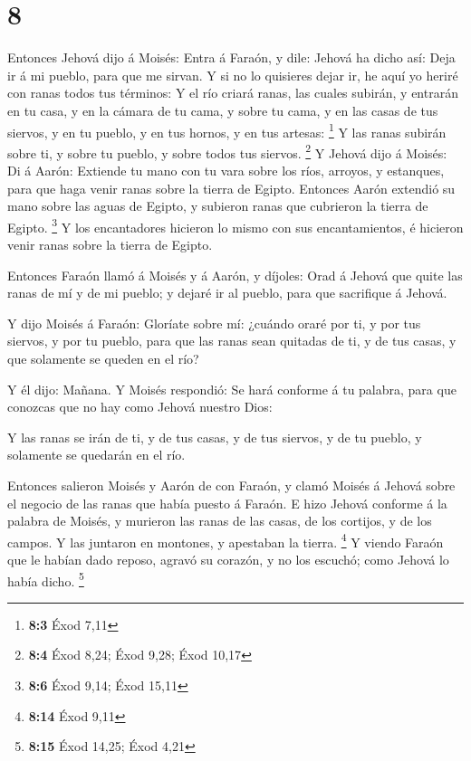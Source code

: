 \hypertarget{section-7}{%
\section{8}\label{section-7}}

 Entonces Jehová dijo á Moisés: Entra á Faraón, y dile:
Jehová ha dicho así: Deja ir á mi pueblo, para que me sirvan.
 Y si no lo quisieres dejar ir, he aquí yo heriré con
ranas todos tus términos:  Y el río criará ranas, las
cuales subirán, y entrarán en tu casa, y en la cámara de tu cama, y
sobre tu cama, y en las casas de tus siervos, y en tu pueblo, y en tus
hornos, y en tus artesas: \footnote{\textbf{8:3} Éxod 7,11}
 Y las ranas subirán sobre ti, y sobre tu pueblo, y sobre
todos tus siervos. \footnote{\textbf{8:4} Éxod 8,24; Éxod 9,28; Éxod
  10,17}  Y Jehová dijo á Moisés: Di á Aarón: Extiende tu
mano con tu vara sobre los ríos, arroyos, y estanques, para que haga
venir ranas sobre la tierra de Egipto.  Entonces Aarón
extendió su mano sobre las aguas de Egipto, y subieron ranas que
cubrieron la tierra de Egipto. \footnote{\textbf{8:6} Éxod 9,14; Éxod
  15,11}  Y los encantadores hicieron lo mismo con sus
encantamientos, é hicieron venir ranas sobre la tierra de Egipto.

 Entonces Faraón llamó á Moisés y á Aarón, y díjoles: Orad
á Jehová que quite las ranas de mí y de mi pueblo; y dejaré ir al
pueblo, para que sacrifique á Jehová.

 Y dijo Moisés á Faraón: Gloríate sobre mí: ¿cuándo oraré
por ti, y por tus siervos, y por tu pueblo, para que las ranas sean
quitadas de ti, y de tus casas, y que solamente se queden en el río?

 Y él dijo: Mañana. Y Moisés respondió: Se hará conforme
á tu palabra, para que conozcas que no hay como Jehová nuestro Dios:

 Y las ranas se irán de ti, y de tus casas, y de tus
siervos, y de tu pueblo, y solamente se quedarán en el río.

 Entonces salieron Moisés y Aarón de con Faraón, y clamó
Moisés á Jehová sobre el negocio de las ranas que había puesto á Faraón.
 E hizo Jehová conforme á la palabra de Moisés, y
murieron las ranas de las casas, de los cortijos, y de los campos.
 Y las juntaron en montones, y apestaban la tierra.
\footnote{\textbf{8:14} Éxod 9,11}  Y viendo Faraón que
le habían dado reposo, agravó su corazón, y no los escuchó; como Jehová
lo había dicho. \footnote{\textbf{8:15} Éxod 14,25; Éxod 4,21}

